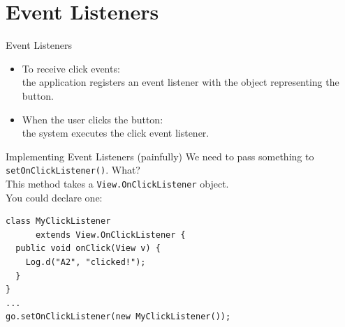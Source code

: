 \documentclass[aspectratio=169]{beamer}
\begin{document}
\section*{Event Listeners}



\begin{frame}{Event Listeners}
\begin{itemize}
\item To receive click events: \\
the application registers an event 
listener with the object representing the button.\\
\item When the user clicks the button: \\
the system executes the click event listener.
\end{itemize}
\end{frame}



\begin{frame}[fragile]{Implementing Event Listeners (painfully)}
We need to pass something to {\tt setOnClickListener()}. What?\\[1em]

This method takes a {\tt View.OnClickListener} object.\\[1em]

You could declare one:

{\small
\begin{verbatim}
class MyClickListener 
      extends View.OnClickListener {
  public void onClick(View v) {
    Log.d("A2", "clicked!");
  }
}
...
go.setOnClickListener(new MyClickListener()); 
\end{verbatim}
}

\end{frame}
\end{document}
